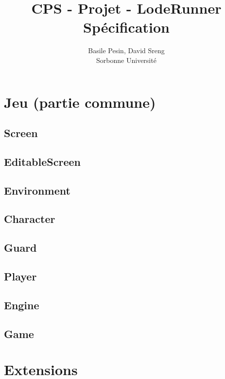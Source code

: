 \documentclass{article}
\title{CPS - Projet - LodeRunner\\Spécification}
\author{Basile Pesin, David Sreng\\Sorbonne Université}
\begin{document}
\maketitle

\section{Jeu (partie commune)}

\subsection{Screen}

\subsection{EditableScreen}

\subsection{Environment}

\subsection{Character}

\subsection{Guard}

\subsection{Player}

\subsection{Engine}

\subsection{Game}

\section{Extensions}
\end{document}
